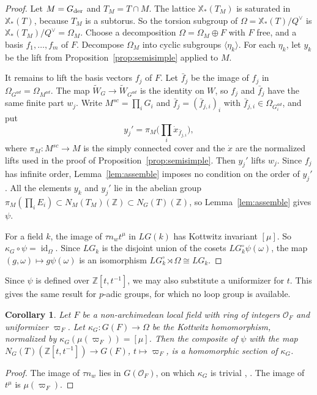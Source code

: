 \documentclass[psamsfonts]{amsart}
\newtheorem{cor}[thm]{Corollary}
\theoremstyle{definition}
\theoremstyle{remark}
\numberwithin{equation}{section}
\newcommand{\Z}{\mathbb{Z}}   %
\newcommand{\X}{\mathbb{X}}
\newcommand{\extw}{\widetilde{W}}
\newcommand{\ra}{\rightarrow}
\DeclareMathOperator{\id}{id}
\newcommand\cO{\mathcal{O}}
\newcommand{\der}{\textup{der}}
\numberwithin{equation}{section}
\newcommand{\om}{\omega}
\newcommand{\Om}{\Omega}
\theoremstyle{plain}
\begin{document}
\begin{proof}
Let $M=G_{\der}$ and $T_M=T\cap M$. The lattice $\X_*(T_M)$ is saturated in $\X_*(T)$, because $T_M$ is a subtorus. So the torsion subgroup of $\Om=\X_*(T)/Q^\vee$ is $\X_*(T_M)/Q^\vee=\Om_M$. Choose a decomposition $\Om=\Om_M\oplus F$ with $F$ free, and a basis $f_1,\dots,f_m$ of $F$. Decompose $\Om_M$ into cyclic subgroups $\langle\eta_k\rangle$. For each $\eta_k$, let $y_k$ be the lift from Proposition~\ref{prop:semisimple} applied to $M$.

It remains to lift the basis vectors $f_j$ of $F$. Let $\bar f_j$ be the image of $f_j$ in $\Om_{G^{ad}}=\Om_{M^{ad}}$. The map $\extw_G\ra\extw_{G^{ad}}$ is the identity on $W$, so $f_j$ and $\bar f_j$ have the same finite part $w_j$. Write $M^{sc}=\prod_iG_i$ and $\bar f_j=(\bar f_{j,i})_i$ with $\bar f_{j,i}\in\Om_{G_i^{ad}}$, and put
\[
y_j'=\pi_M\Big(\prod_i\dot x_{\bar f_{j,i}}\Big),
\]
where $\pi_M\colon M^{sc}\ra M$ is the simply connected cover and the $\dot x$ are the normalized lifts used in the proof of Proposition~\ref{prop:semisimple}. Then $y_j'$ lifts $w_j$. Since $f_j$ has infinite order, Lemma~\ref{lem:assemble} imposes no condition on the order of $y_j'$. All the elements $y_k$ and $y_j'$ lie in the abelian group $\pi_M(\prod_iE_i)\subset N_M(T_M)(\Z)\subset N_G(T)(\Z)$, so Lemma~\ref{lem:assemble} gives $\psi$.

For a field $k$, the image of $\tau n_wt^{\mu}$ in $LG(k)$ has Kottwitz invariant $[\mu]$. So $\kappa_G\circ\psi=\id_{\Om}$. Since $LG_k$ is the disjoint union of the cosets $LG_k^{\circ}\psi(\om)$, the map $(g,\om)\mapsto g\psi(\om)$ is an isomorphism $LG_k^{\circ}\rtimes\Om\cong LG_k$.
\end{proof}

Since $\psi$ is defined over $\Z[t,t^{-1}]$, we may also substitute a uniformizer for $t$. This gives the same result for $p$-adic groups, for which no loop group is available.

\begin{cor}\label{cor:local-field}
Let $F$ be a non-archimedean local field with ring of integers $\cO_F$ and uniformizer $\varpi_F$. Let $\kappa_G\colon G(F)\ra\Om$ be the Kottwitz homomorphism, normalized by $\kappa_G(\mu(\varpi_F))=[\mu]$. Then the composite of $\psi$ with the map $N_G(T)(\Z[t,t^{-1}])\ra G(F)$, $t\mapsto\varpi_F$, is a homomorphic section of $\kappa_G$.
\end{cor}

\begin{proof}
The image of $\tau n_w$ lies in $G(\cO_F)$, on which $\kappa_G$ is trivial \cite[\S7]{Ko97}, \cite{HR08}. The image of $t^{\mu}$ is $\mu(\varpi_F)$.
\end{proof}
\end{document}

